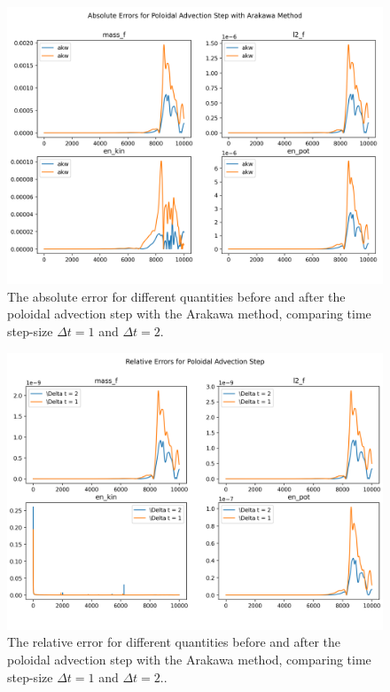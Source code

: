 \begin{figure}
	\centering
	\includegraphics[width=0.9\linewidth]{plots/abs_err akw}
	\caption{The absolute error for different quantities before and after the poloidal advection step with the Arakawa method, comparing time step-size $\Delta t = 1$ and $\Delta t = 2$.}
	\label{fig:abserr_akw}
\end{figure}


\begin{figure}
	\centering
	\includegraphics[width=0.9\linewidth]{plots/rel_err akw}
	\caption{The relative error for different quantities before and after the poloidal advection step with the Arakawa method, comparing time step-size $\Delta t = 1$ and $\Delta t = 2$..}
	\label{fig:relerr_akw}
\end{figure}


